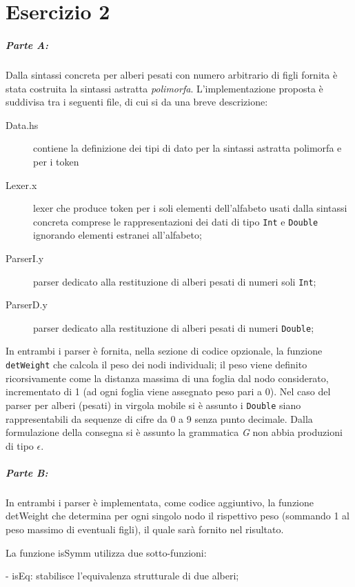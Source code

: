 \documentclass[a4paper, oneside, 11pt]{article}
\begin{document}
\section*{Esercizio 2}
\subparagraph*{Parte A:}
Dalla sintassi concreta per alberi pesati con numero arbitrario di figli fornita \`e stata costruita la sintassi astratta \textit{polimorfa}.
L'implementazione proposta \`e suddivisa tra i seguenti file, di cui si da una breve descrizione:
\begin{description}
	\item[Data.hs] contiene la definizione dei tipi di dato per la sintassi astratta polimorfa  e per i token
	\item[Lexer.x] lexer che produce token per i soli elementi dell'alfabeto usati dalla sintassi concreta comprese le rappresentazioni dei dati di tipo \texttt{Int} e \texttt{Double} ignorando elementi estranei all'alfabeto;
	\item[ParserI.y] parser dedicato alla restituzione di alberi pesati di numeri soli \texttt{Int};
	\item[ParserD.y] parser dedicato alla restituzione di alberi pesati di numeri \texttt{Double};
\end{description}	
\par
In entrambi i parser \`e fornita, nella sezione di codice opzionale, la funzione \texttt{detWeight} che calcola il peso dei nodi individuali; il peso viene definito ricorsivamente come la distanza massima di una foglia dal nodo considerato, incrementato di 1 (ad ogni foglia viene assegnato peso pari a 0). 
Nel caso del parser per alberi (pesati) in virgola mobile si \`e assunto i \texttt{Double} siano rappresentabili da sequenze di cifre da 0 a 9 senza punto decimale.
Dalla formulazione della consegna si \`e assunto la grammatica \textit{G} non abbia produzioni di tipo \(\epsilon\).
\subparagraph*{Parte B:}





\newpage
In entrambi i parser \`e implementata, come codice aggiuntivo, la funzione detWeight che determina per ogni singolo nodo il rispettivo peso (sommando 1 al peso massimo di eventuali figli), il quale sarà fornito nel risultato.

   La funzione isSymm utilizza due sotto-funzioni:

- isEq: stabilisce l'equivalenza strutturale di due alberi;
\end{document}
